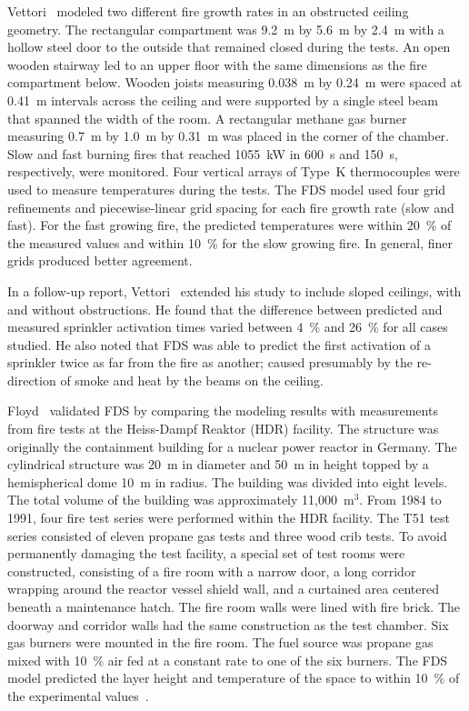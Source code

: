 Vettori~\cite{Vettori:1} modeled two different fire growth rates in an obstructed ceiling geometry.  The rectangular compartment was 9.2~m by 5.6~m
by 2.4~m  with a hollow steel door to  the outside that remained closed during the tests. An open wooden stairway led to an upper floor with the same
dimensions as the fire compartment below.  Wooden joists measuring 0.038~m by 0.24~m were spaced at 0.41~m intervals across the ceiling and  were
supported  by a single  steel beam that  spanned the width of the  room.  A rectangular methane gas  burner measuring 0.7~m by 1.0~m by 0.31~m was
placed  in the corner of the chamber.  Slow and fast  burning  fires  that  reached  1055~kW  in  600~s  and  150~s, respectively,  were
monitored.   Four   vertical  arrays  of  Type~K thermocouples were used to measure temperatures during the tests.  The FDS model used four grid
refinements and piecewise-linear grid spacing for each fire growth rate (slow  and fast). For the fast growing fire, the predicted  temperatures were
within  20~\% of the  measured values and within  10~\% for the slow  growing fire. In  general, finer grids produced better agreement.

In a follow-up report,  Vettori~\cite{Vettori:2} extended his study to include sloped ceilings, with  and without obstructions. He found that the
difference between  predicted and  measured  sprinkler activation times varied  between 4~\%  and 26~\% for  all cases studied.  He also noted that
FDS was able to predict the first activation of a sprinkler twice  as far  from  the fire  as  another; caused  presumably by  the re-direction of
smoke and heat by the beams on the ceiling.

Floyd~\cite{Floyd:5,Floyd:6} validated  FDS by comparing  the modeling results with  measurements from fire tests at  the Heiss-Dampf Reaktor (HDR)
facility.  The structure was originally the containment building for a nuclear power reactor  in Germany. The cylindrical structure was 20~m in
diameter and  50~m in height  topped by a  hemispherical dome 10~m  in radius.   The building  was divided  into eight  levels.  The total  volume of
the building  was approximately  11,000~m$^3$.  From 1984  to 1991, four  fire test  series were  performed within  the HDR facility.  The T51  test
series consisted of eleven  propane gas tests and three  wood crib  tests.  To avoid  permanently damaging  the test facility, a special set of  test
rooms were constructed, consisting of a fire  room with a narrow  door, a long corridor  wrapping around the reactor vessel  shield wall, and  a
curtained area centered  beneath a maintenance  hatch.   The  fire   room  walls  were  lined  with  fire brick. The doorway and corridor walls had
the same construction as the test chamber. Six gas burners were mounted in the fire room.  The fuel source was propane gas mixed with  10~\% air fed
at a constant rate to one of the  six burners.
The FDS model predicted the  layer height and temperature of the space to within 10~\% of the experimental values~\cite{Floyd:5}.

